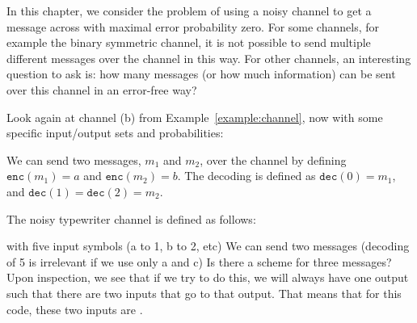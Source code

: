 In this chapter, we consider the problem of using a noisy channel to get a message across with maximal error probability zero. For some channels, for example the binary symmetric channel, it is not possible to send multiple different messages over the channel in this way. For other channels, an interesting question to ask is: how many messages (or how much information) can be sent over this channel in an error-free way?

\begin{example}
Look again at channel (b) from Example~\ref{example:channel}, now with some specific input/output sets and probabilities:
\begin{center}
\end{center}
We can send two messages, $m_1$ and $m_2$, over the channel by defining $\mathtt{enc}(m_1) = a$ and $\mathtt{enc}(m_2) = b$. The decoding is defined as $\mathtt{dec}(0) = m_1$, and $\mathtt{dec}(1) = \mathtt{dec}(2) = m_2$.
\end{example}


\begin{example}
The noisy typewriter channel is defined as follows:
\begin{center}
\end{center}
with five input symbols (a to 1, b to 2, etc)
We can send two messages (decoding of 5 is irrelevant if we use only a and c)
Is there a scheme for three messages? Upon inspection, we see that if we try to do this, we will always have one output such that there are two inputs that go to that output. That means that for this code, these two inputs are .
\end{example}

